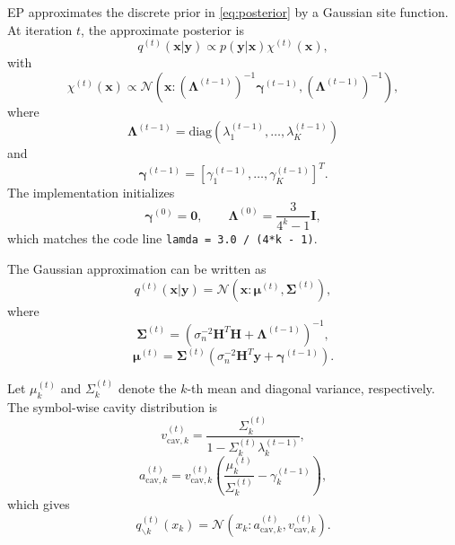 \documentclass[conference]{IEEEtran}
\begin{document}
EP approximates the discrete prior in \eqref{eq:posterior} by a Gaussian site function. At iteration $t$, the approximate posterior is
\begin{equation}
q^{(t)}(\mathbf{x}|\mathbf{y})
\propto
p(\mathbf{y}|\mathbf{x})\chi^{(t)}(\mathbf{x}),
\label{eq:q_t}
\end{equation}
with
\begin{equation}
\chi^{(t)}(\mathbf{x})
\propto
\mathcal{N}
\left(
\mathbf{x}:
(\bm{\Lambda}^{(t-1)})^{-1}\bm{\gamma}^{(t-1)},
(\bm{\Lambda}^{(t-1)})^{-1}
\right),
\label{eq:site_function}
\end{equation}
where
\begin{equation}
\bm{\Lambda}^{(t-1)} = \mathrm{diag}(\lambda_1^{(t-1)},\ldots,\lambda_K^{(t-1)})
\end{equation}
and
\begin{equation}
\bm{\gamma}^{(t-1)} = [\gamma_1^{(t-1)},\ldots,\gamma_K^{(t-1)}]^T.
\end{equation}
The implementation initializes
\begin{equation}
\bm{\gamma}^{(0)}=\mathbf{0},
\qquad
\bm{\Lambda}^{(0)}=\frac{3}{4^k-1}\mathbf{I},
\label{eq:init_ep}
\end{equation}
which matches the code line
\texttt{lamda = 3.0 / (4\string**k - 1)}.

The Gaussian approximation can be written as
\begin{equation}
q^{(t)}(\mathbf{x}|\mathbf{y})
=
\mathcal{N}
(\mathbf{x}:\bm{\mu}^{(t)},\bm{\Sigma}^{(t)}),
\end{equation}
where
\begin{equation}
\bm{\Sigma}^{(t)}=
\left(
\sigma_n^{-2}\mathbf{H}^T\mathbf{H}
+
\bm{\Lambda}^{(t-1)}
\right)^{-1},
\label{eq:sigma_t}
\end{equation}
\begin{equation}
\bm{\mu}^{(t)}=
\bm{\Sigma}^{(t)}
\left(
\sigma_n^{-2}\mathbf{H}^T\mathbf{y}
+
\bm{\gamma}^{(t-1)}
\right).
\label{eq:mu_t}
\end{equation}

Let $\mu_k^{(t)}$ and $\Sigma_k^{(t)}$ denote the $k$-th mean and diagonal variance, respectively. The symbol-wise cavity distribution is
\begin{equation}
v_{\mathrm{cav},k}^{(t)}
=
\frac{\Sigma_k^{(t)}}
{1-\Sigma_k^{(t)}\lambda_k^{(t-1)}},
\label{eq:vcav}
\end{equation}
\begin{equation}
a_{\mathrm{cav},k}^{(t)}
=
v_{\mathrm{cav},k}^{(t)}
\left(
\frac{\mu_k^{(t)}}{\Sigma_k^{(t)}}-\gamma_k^{(t-1)}
\right),
\label{eq:acav}
\end{equation}
which gives
\begin{equation}
q_{\backslash k}^{(t)}(x_k)
=
\mathcal{N}
\!\left(
x_k:
a_{\mathrm{cav},k}^{(t)},
v_{\mathrm{cav},k}^{(t)}
\right).
\label{eq:cavity}
\end{equation}
\end{document}
